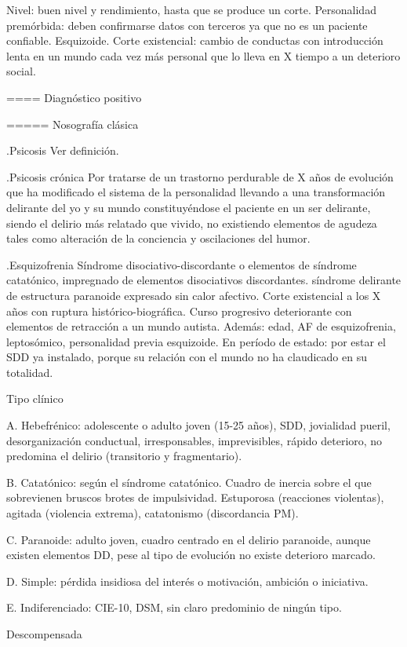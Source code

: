 Nivel: buen nivel y rendimiento, hasta que se produce un corte. Personalidad premórbida: deben confirmarse datos con terceros ya que no es un paciente confiable. Esquizoide. Corte existencial: cambio de conductas con introducción lenta en un mundo cada vez más personal que lo lleva en X tiempo a un deterioro social.

==== Diagnóstico positivo

===== Nosografía clásica

.Psicosis
Ver definición.

.Psicosis crónica
Por tratarse de un trastorno perdurable de X años de evolución que ha modificado el sistema de la personalidad llevando a una transformación delirante del yo y su mundo constituyéndose el paciente en un ser delirante, siendo el delirio más relatado que vivido, no existiendo elementos de agudeza tales como alteración de la conciencia y oscilaciones del humor.

.Esquizofrenia
Síndrome disociativo-discordante o elementos de síndrome catatónico, impregnado de elementos disociativos discordantes. síndrome delirante de estructura paranoide expresado sin calor afectivo. Corte existencial a los X años con ruptura histórico-biográfica. Curso progresivo deteriorante con elementos de retracción a un mundo autista. Además: edad, AF de esquizofrenia, leptosómico, personalidad previa esquizoide. En período de estado: por estar el SDD ya instalado, porque su relación con el mundo no ha claudicado en su totalidad.

Tipo clínico

A. Hebefrénico: adolescente o adulto joven (15-25 años), SDD, jovialidad pueril, desorganización conductual, irresponsables, imprevisibles, rápido deterioro, no predomina el delirio (transitorio y fragmentario).

B. Catatónico: según el síndrome catatónico. Cuadro de inercia sobre el que sobrevienen bruscos brotes de impulsividad. Estuporosa (reacciones violentas), agitada (violencia extrema), catatonismo (discordancia PM).

C. Paranoide: adulto joven, cuadro centrado en el delirio paranoide, aunque existen elementos DD, pese al tipo de evolución no existe deterioro marcado.

D. Simple: pérdida insidiosa del interés o motivación, ambición o iniciativa.

E. Indiferenciado: CIE-10, DSM, sin claro predominio de ningún tipo.

Descompensada

